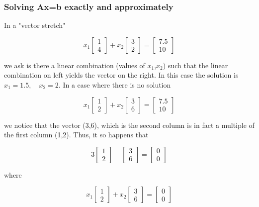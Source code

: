 \documentclass[main.tex]{subfiles}
\begin{document}
    \subsubsection{Solving Ax=b exactly and approximately}
    
    In a "vector stretch"
    
    $$x_{1}\left[\begin{array}{l}1 \\ 4\end{array}\right]+x_{2}\left[\begin{array}{l}3 \\ 2\end{array}\right]=\left[\begin{array}{r}7.5 \\ 10\end{array}\right]$$
    
    we ask is there a linear combination (values of $x_1$,$x_2$) such that the linear combination on left yields the vector on the right. In this case the solution is $x_{1}=1.5, \quad x_{2}=2$. In a case where there is no solution 
    
    $$x_{1}\left[\begin{array}{l}1 \\ 2\end{array}\right]+x_{2}\left[\begin{array}{l}3 \\ 6\end{array}\right]=\left[\begin{array}{r}7.5 \\ 10\end{array}\right]$$
    
    we notice that the vector (3,6), which is the second column is in fact a multiple of the first column (1,2). Thus, it so happens that
    
    $$3\left[\begin{array}{l}1 \\ 2\end{array}\right]-\left[\begin{array}{l}3 \\ 6\end{array}\right]=\left[\begin{array}{l}0 \\ 0\end{array}\right]$$
    
    where 
    
    $$x_{1}\left[\begin{array}{l}1 \\ 2\end{array}\right]+x_{2}\left[\begin{array}{l}3 \\ 6\end{array}\right]=\left[\begin{array}{l}0 \\ 0\end{array}\right]$$
    
\end{document}
